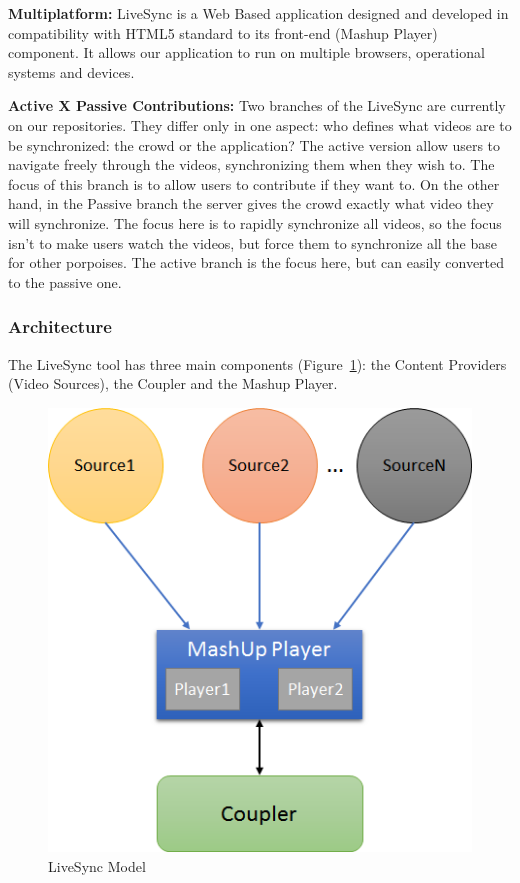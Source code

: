 \documentclass[sigconf]{acmart}
\begin{document}
\textbf{Multiplatform:} LiveSync is a Web Based application designed and developed in compatibility with HTML5 standard to its front-end (Mashup Player) component. It allows our application to run on multiple browsers, operational systems and devices.

\textbf{Active X Passive Contributions:} Two branches of the LiveSync are currently on our repositories. They differ only in one aspect: who defines what videos are to be synchronized: the crowd or the application? The active version allow users to navigate freely through the videos, synchronizing them when they wish to. The focus of this branch is to allow users to contribute if they want to. On the other hand, in the Passive branch the server gives the crowd exactly what video they will synchronize. The focus here is to rapidly synchronize all videos, so the focus isn’t to make users watch the videos, but force them to synchronize all the base for other porpoises. The active branch is the focus here, but can easily converted to the passive one.

\subsubsection{Architecture}

The LiveSync tool has three main components (Figure~\ref{live_arq}): the Content Providers (Video Sources), the Coupler and the Mashup Player.

\begin{figure}[h]
	\centerline{\includegraphics[scale=0.6] {figures/arqchitecture}}
	\caption{LiveSync Model}
	\label{live_arq}
\end{figure}
\end{document}

